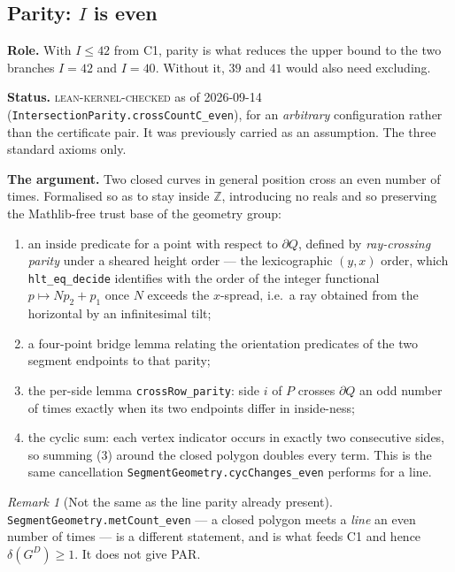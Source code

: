 \documentclass[11pt,a4paper]{article}
\theoremstyle{plain}
\theoremstyle{definition}
\theoremstyle{remark}
\newtheorem*{remark}{Remark}
\newcommand{\GD}{G^{D}}
\newcommand{\stat}[1]{\footnotesize\textsc{#1}}
\begin{document}
\subsection{\texorpdfstring{Parity: $I$ is even}{Parity: I is even}}\label{sec:par}

\textbf{Role.} With $I\le42$ from \textsf{C1}, parity is what reduces the upper
bound to the two branches $I=42$ and $I=40$. Without it, $39$ and $41$ would
also need excluding.

\textbf{Status.} \stat{lean-kernel-checked} as of 2026-09-14
(\texttt{IntersectionParity.crossCountC\_even}), for an \emph{arbitrary}
configuration rather than the certificate pair. It was previously carried as an
assumption. The three standard axioms only.

\textbf{The argument.} Two closed curves in general position cross an even
number of times. Formalised so as to stay inside $\mathbb{Z}$, introducing no
reals and so preserving the Mathlib-free trust base of the geometry group:

\begin{enumerate}\itemsep0pt
  \item an $\mathrm{inside}$ predicate for a point with respect to $\partial Q$,
        defined by \emph{ray-crossing parity} under a sheared height order --- the
        lexicographic $(y,x)$ order, which \texttt{hlt\_eq\_decide} identifies
        with the order of the integer functional $p\mapsto N p_2+p_1$ once $N$
        exceeds the $x$-spread, i.e.\ a ray obtained from the horizontal by an
        infinitesimal tilt;
  \item a four-point bridge lemma relating the orientation predicates of the two
        segment endpoints to that parity;
  \item the per-side lemma \texttt{crossRow\_parity}: side $i$ of $P$ crosses
        $\partial Q$ an odd number of times exactly when its two endpoints differ
        in inside-ness;
  \item the cyclic sum: each vertex indicator occurs in exactly two consecutive
        sides, so summing (3) around the closed polygon doubles every term. This
        is the same cancellation \texttt{SegmentGeometry.cycChanges\_even}
        performs for a line.
\end{enumerate}

\begin{remark}[Not the same as the line parity already present]
\texttt{SegmentGeometry.metCount\_even} --- a closed polygon meets a \emph{line}
an even number of times --- is a different statement, and is what feeds
\textsf{C1} and hence $\delta(\GD)\ge1$. It does not give \textsf{PAR}.
\end{remark}
\end{document}
